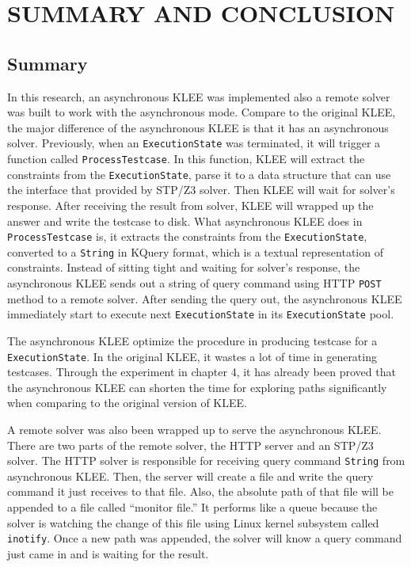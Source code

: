 \chapter{SUMMARY AND CONCLUSION}%

\section{Summary}
In this research, an asynchronous KLEE was implemented also a remote solver was built to work with the asynchronous mode. Compare to the original KLEE, the major difference of the asynchronous KLEE is that it has an asynchronous solver. Previously, when an \texttt{ExecutionState} was terminated, it will trigger a function called \texttt{ProcessTestcase}. In this function, KLEE will extract the constraints from the \texttt{ExecutionState}, parse it to a data structure that can use the interface that provided by STP/Z3 solver. Then KLEE will wait for solver's response. After receiving the result from solver, KLEE will wrapped up the answer and write the testcase to disk. What asynchronous KLEE does in \texttt{ProcessTestcase} is, it extracts the constraints from the \texttt{ExecutionState}, converted to a \texttt{String} in KQuery format, which is a textual representation of constraints. Instead of sitting tight and waiting for solver's response, the asynchronous KLEE sends out a string of query command using HTTP \texttt{POST} method to a remote solver. After sending the query out, the asynchronous KLEE immediately start to execute next \texttt{ExecutionState} in its \texttt{ExecutionState} pool. 

The asynchronous KLEE optimize the procedure in producing testcase for a \texttt{ExecutionState}. In the original KLEE, it wastes a lot of time in generating testcases. Through the experiment in chapter 4, it has already been proved that the asynchronous KLEE can shorten the time for exploring paths significantly when comparing to the original version of KLEE.

A remote solver was also been wrapped up to serve the asynchronous KLEE. There are two parts of the remote solver, the HTTP server and an STP/Z3 solver. The HTTP solver is responsible for receiving query command \texttt{String} from asynchronous KLEE. Then, the server will create a file and write the query command it just receives to that file. Also, the absolute path of that file will be appended to a file called ``monitor file.'' It performs like a queue because the solver is watching the change of this file using Linux kernel subsystem called \texttt{inotify}. Once a new path was appended, the solver will know a query command just came in and is waiting for the result.

